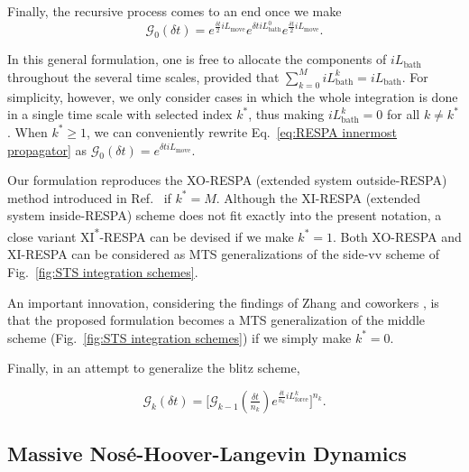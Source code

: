 \documentclass[
    journal=jctcce,
    layout=twocolumn
]{achemso}
\newcommand{\Liu}{i\!L}
\begin{document}
Finally, the recursive process comes to an end once we make
\begin{equation}
\label{eq:RESPA innermost propagator}
\mathcal{G}_0(\delta t) = e^{\frac{\delta t}{2} \Liu_\mathrm{move}}
e^{\delta t \Liu_\mathrm{bath}^0}
e^{\frac{\delta t}{2} \Liu_\mathrm{move}}.
\end{equation}

In this general formulation, one is free to allocate the components of $\Liu_\mathrm{bath}$ throughout the several time scales, provided that $\sum_{k=0}^M \Liu_\mathrm{bath}^k = \Liu_\mathrm{bath}$.
For simplicity, however, we only consider cases in which the whole integration is done in a single time scale with selected index $k^\ast$, thus making $\Liu_\mathrm{bath}^k = 0$ for all $k \neq k^\ast$.
When $k^\ast \geq 1$, we can conveniently rewrite Eq.~\eqref{eq:RESPA innermost propagator} as $\mathcal{G}_0(\delta t) = e^{\delta t \Liu_\mathrm{move}}$.

Our formulation reproduces the XO-RESPA (extended system outside-RESPA) method introduced in Ref.~ if $k^\ast = M$.
Although the XI-RESPA (extended system inside-RESPA) scheme \cite{Martyna_1996} does not fit exactly into the present notation, a close variant XI\textsuperscript{*}-RESPA can be devised if we make $k^\ast = 1$.
Both XO-RESPA and XI-RESPA can be considered as MTS generalizations of the side-vv scheme of Fig.~\ref{fig:STS integration schemes}.

An important innovation, considering the findings of Zhang and coworkers \cite{Zhang_2017}, is that the proposed formulation becomes a MTS generalization of the middle scheme (Fig.~\ref{fig:STS integration schemes}) if we simply make $k^\ast = 0$.

Finally, in an attempt to generalize the blitz scheme, 

\begin{equation}
\label{eq:RESPA scheme 2}
\mathcal{G}_k(\delta t) = \Big[
\mathcal{G}_{k-1}\left(\tfrac{\delta t}{n_k}\right)
e^{\frac{\delta t}{n_k} \Liu_\mathrm{force}^k}
\Big]^{n_k}.
\end{equation}

\subsection{Massive Nos\'e-Hoover-Langevin Dynamics}
\end{document}

